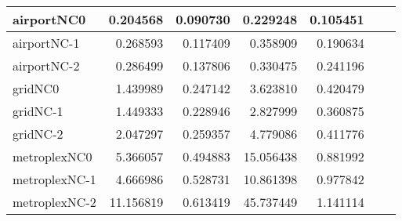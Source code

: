 \begin{longtable}{|l|r|r|r|r|r|r|}
airportNC0 & 0.204568 & 0.090730 & 0.229248 & 0.105451 \\ \hline
airportNC-1 & 0.268593 & 0.117409 & 0.358909 & 0.190634 \\ \hline
airportNC-2 & 0.286499 & 0.137806 & 0.330475 & 0.241196 \\ \hline
gridNC0 & 1.439989 & 0.247142 & 3.623810 & 0.420479 \\ \hline
gridNC-1 & 1.449333 & 0.228946 & 2.827999 & 0.360875 \\ \hline
gridNC-2 & 2.047297 & 0.259357 & 4.779086 & 0.411776 \\ \hline
metroplexNC0 & 5.366057 & 0.494883 & 15.056438 & 0.881992 \\ \hline
metroplexNC-1 & 4.666986 & 0.528731 & 10.861398 & 0.977842 \\ \hline
metroplexNC-2 & 11.156819 & 0.613419 & 45.737449 & 1.141114 \\ \hline
\end{longtable}
